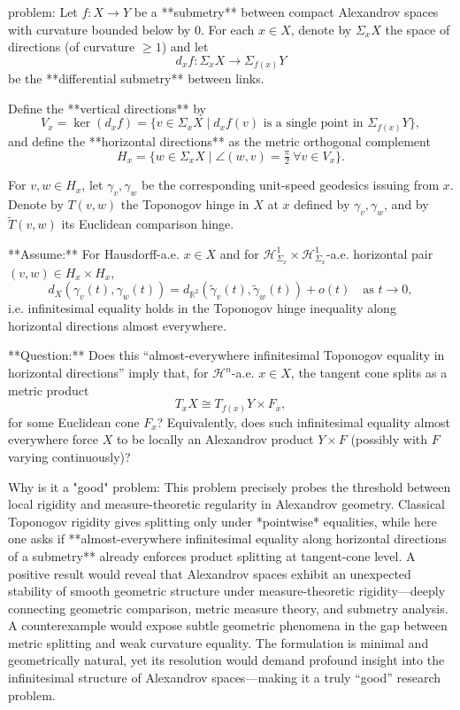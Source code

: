 problem:  
Let \(f : X \to Y\) be a **submetry** between compact Alexandrov spaces with curvature bounded below by \(0\).  
For each \(x \in X\), denote by \(\Sigma_x X\) the space of directions (of curvature \(\ge 1\)) and let  
\[
d_x f : \Sigma_x X \to \Sigma_{f(x)} Y
\]
be the **differential submetry** between links.  

Define the **vertical directions** by  
\[
V_x = \ker(d_x f) = \{v \in \Sigma_x X \mid d_x f(v) \text{ is a single point in } \Sigma_{f(x)} Y\},
\]
and define the **horizontal directions** as the metric orthogonal complement  
\[
H_x = \{w \in \Sigma_x X \mid \angle(w,v) = \tfrac{\pi}{2} \ \forall v \in V_x\}.
\]

For \(v,w \in H_x\), let \(\gamma_v,\gamma_w\) be the corresponding unit-speed geodesics issuing from \(x\).  
Denote by \(T(v,w)\) the Toponogov hinge in \(X\) at \(x\) defined by \(\gamma_v,\gamma_w\), and by \(\tilde{T}(v,w)\) its Euclidean comparison hinge.  

**Assume:** For Hausdorff-a.e. \(x\in X\) and for \( \mathcal{H}^1_{\Sigma_x}\times \mathcal{H}^1_{\Sigma_x}\)-a.e. horizontal pair \((v,w)\in H_x\times H_x\),
\[
d_X(\gamma_v(t), \gamma_w(t)) = d_{\mathbb{R}^2}(\tilde{\gamma}_v(t), \tilde{\gamma}_w(t)) + o(t)
\quad \text{as } t\to 0,
\]
i.e. infinitesimal equality holds in the Toponogov hinge inequality along horizontal directions almost everywhere.

**Question:**  
Does this “almost-everywhere infinitesimal Toponogov equality in horizontal directions” imply that, for \(\mathcal{H}^n\)-a.e. \(x\in X\), the tangent cone splits as a metric product
\[
T_x X \cong T_{f(x)} Y \times F_x,
\]
for some Euclidean cone \(F_x\)?  
Equivalently, does such infinitesimal equality almost everywhere force \(X\) to be locally an Alexandrov product \(Y\times F\) (possibly with \(F\) varying continuously)?

Why is it a "good" problem:  
This problem precisely probes the threshold between local rigidity and measure-theoretic regularity in Alexandrov geometry. Classical Toponogov rigidity gives splitting only under *pointwise* equalities, while here one asks if **almost-everywhere infinitesimal equality along horizontal directions of a submetry** already enforces product splitting at tangent-cone level.  
A positive result would reveal that Alexandrov spaces exhibit an unexpected stability of smooth geometric structure under measure-theoretic rigidity—deeply connecting geometric comparison, metric measure theory, and submetry analysis. A counterexample would expose subtle geometric phenomena in the gap between metric splitting and weak curvature equality. The formulation is minimal and geometrically natural, yet its resolution would demand profound insight into the infinitesimal structure of Alexandrov spaces—making it a truly “good” research problem.